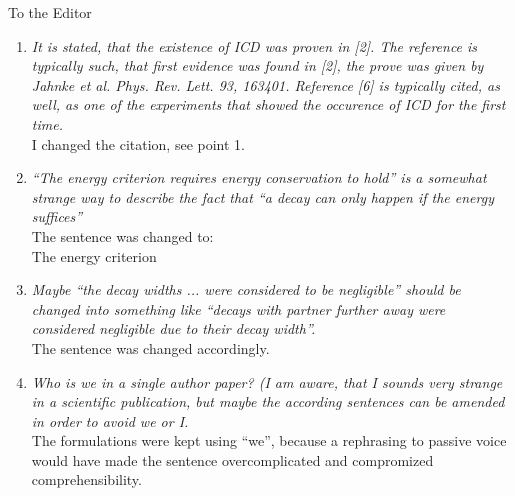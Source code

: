 \documentclass[DIN,pagenumber=false,parskip=half,fromalign=left,fromphone=true,fromemail=true,fromurl=false,fromlogo=false,fromrule=false]{scrlttr2}
\begin{document}
\begin{letter}{To the Editor}
\begin{enumerate}
\begin{equation*}
 A^{*+} + B \rightarrow A^+ + B^+ + e^-_{ICD}  .
\end{equation*}

In the final state,
the two units $A$ and $B$ are both positively charged, repell each other and
thereby undergo a Coulomb explosion. This process was predicted theoretically
[3], {\color{blue}{later
the first experimental evidence was found in
[4, 5] and the experimental prove was given by Jahnke et al.
[6]. Since then
it has been studied in a multitude of different systems such as small and large
rare gas clusters [7, 8, 9, 10, 11, 12, 13, 14, 15],}}
clusters of small molecules [16, 17, 18, 19, 20],
quantum dots [21], proteins [22], it is expected
to play a role in DNA damage in radiation therapy [23]
and may be used to destroy malign tissue [24, 25].

 \item \emph{It is stated, that the existence of ICD was proven in [2]. The reference is typically such, that first evidence was found in [2], the prove was given by Jahnke et al. Phys. Rev. Lett. 93, 163401. Reference [6] is typically cited, as well, as one of the experiments that showed the occurence of ICD for the first time.}\\
I changed the citation, see point 1.

 \item \emph{``The energy criterion requires energy conservation to hold'' is a somewhat strange way to describe the fact that ``a decay can only happen if the energy suffices''}\\
       The sentence was changed to:\\
       The energy criterion {\color{blue}{is a rephrasing of the energy
       conservation stating that a decay can only
       happen if the energy suffices.}}

\item \emph{Maybe ``the decay widths ... were considered to be negligible'' should be changed into something like ``decays with partner further away were considered negligible due to their decay width''.}\\
       The sentence was changed accordingly. 

\item \emph{Who is we in a single author paper? (I am aware, that I sounds very strange in a scientific publication, but maybe the according sentences can be amended in order to avoid we or I.}\\
      The formulations were kept using ``we'', because a rephrasing to passive
      voice would have made the sentence overcomplicated and compromized
      comprehensibility.


\end{enumerate}
\end{letter}
\end{document}
